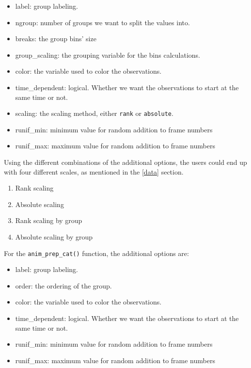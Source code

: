 \begin{itemize}
\tightlist
\item
  label: group labeling.
\item
  ngroup: number of groups we want to split the values into.
\item
  breaks: the group bins' size
\item
  group\_scaling: the grouping variable for the bins calculations.
\item
  color: the variable used to color the observations.
\item
  time\_dependent: logical. Whether we want the observations to start at the same time or not.
\item
  scaling: the scaling method, either \texttt{rank} or \texttt{absolute}.
\item
  runif\_min: minimum value for random addition to frame numbers
\item
  runif\_max: maximum value for random addition to frame numbers
\end{itemize}

Using the different combinations of the additional options, the users could end up with four different scales, as mentioned in the \ref{data} section.

\begin{enumerate}
\def\labelenumi{\arabic{enumi}.}
\item
  Rank scaling
\item
  Absolute scaling
\item
  Rank scaling by group
\item
  Absolute scaling by group
\end{enumerate}

For the \texttt{anim\_prep\_cat()} function, the additional options are:

\begin{itemize}
\tightlist
\item
  label: group labeling.
\item
  order: the ordering of the group.
\item
  color: the variable used to color the observations.
\item
  time\_dependent: logical. Whether we want the observations to start at the same time or not.
\item
  runif\_min: minimum value for random addition to frame numbers
\item
  runif\_max: maximum value for random addition to frame numbers
\end{itemize}

